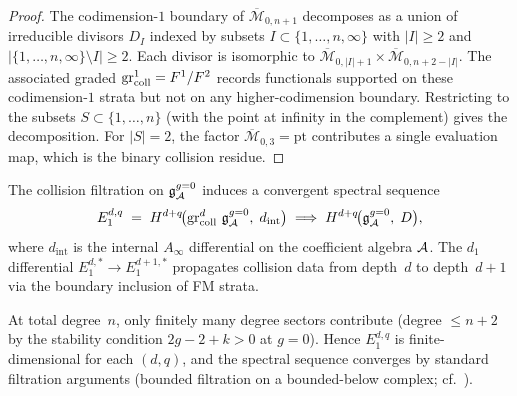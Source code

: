 \begin{proof}
The codimension-$1$ boundary of $\overline{\mathcal{M}}_{0,n+1}$
decomposes as a union of irreducible divisors
$D_I$ indexed by subsets $I \subset \{1,\dotsc,n,\infty\}$
with $|I| \geq 2$ and $|\{1,\dotsc,n,\infty\} \setminus I| \geq 2$.
Each divisor is isomorphic to
$\overline{\mathcal{M}}_{0,|I|+1} \times
\overline{\mathcal{M}}_{0,n+2-|I|}$.
The associated graded
$\operatorname{gr}_{\mathrm{coll}}^1 = F^1 / F^2$ records functionals supported on these
codimension-$1$ strata but not on any higher-codimension boundary.
Restricting to the subsets $S \subset \{1,\dotsc,n\}$ (with the
point at infinity in the complement) gives the decomposition.
For $|S| = 2$, the factor $\overline{\mathcal{M}}_{0,3} = \mathrm{pt}$
contributes a single evaluation map, which is the
binary collision residue.
\end{proof}

\begin{definition}
The collision filtration on $\mathfrak{g}^{g{=}0}_{\mathcal{A}}$ induces a
convergent spectral sequence
\begin{equation}%
E_1^{d,q}
\;=\;
H^{d+q}\!\bigl(
 \grcoll^d\,\mathfrak{g}^{g{=}0}_\cA,\;
 d_{\mathrm{int}}
\bigr)
\;\Longrightarrow\;
H^{d+q}\!\bigl(
 \mathfrak{g}^{g{=}0}_\cA,\;D
\bigr),
\end{equation}
where $d_{\mathrm{int}}$ is the internal $A_\infty$ differential on
the coefficient algebra $\mathcal{A}$. The $d_1$ differential
$E_1^{d,*} \to E_1^{d+1,*}$ propagates collision data from depth~$d$
to depth~$d+1$ via the boundary inclusion of FM strata.

At total degree~$n$, only finitely many degree sectors contribute
(degree $\leq n + 2$ by the stability condition $2g - 2 + k > 0$
at $g = 0$). Hence $E_1^{d,q}$ is finite-dimensional for each
$(d,q)$, and the spectral sequence converges by standard filtration
arguments (bounded filtration on a bounded-below complex;
cf.~\cite{McCleary00}).
\end{definition}

